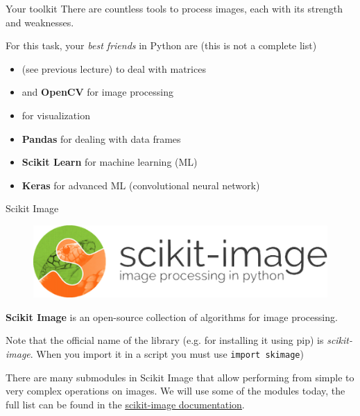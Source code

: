 \documentclass[9pt, aspectratio=169]{beamer}
\begin{document}
\begin{frame}
	{Your toolkit}
	There are countless tools to process images, each with its strength and weaknesses.

	For this task, your \textit{best friends} in Python are (this is not a complete list)

	\begin{itemize}
		\item \textbf{\color{orange}{Numpy}} (see previous lecture) to deal with matrices
		\item \textbf{\color{orange}{Scikit Image}} and \textbf{OpenCV} for image processing
		\item \textbf{\color{orange}{Matplotlib}} for visualization
		\item \textbf{Pandas} for dealing with data frames
		\item \textbf{Scikit Learn} for machine learning (ML)
		\item \textbf{Keras} for advanced ML (convolutional neural network)
	\end{itemize}
\end{frame}

\begin{frame}
	{Scikit Image}
	\begin{figure}
		\centering
		\includegraphics[width=.5\textwidth]{skimage.png}
	\end{figure}
	\textbf{Scikit Image} is an open-source collection of algorithms for image processing.

	Note that the official name of the library (e.g. for installing it using pip) is \textit{scikit-image}. When you import it in a script you must use \texttt{import skimage})

	\pause
	There are many submodules in Scikit Image that allow performing from simple to very complex operations on images. We will use some of the modules today, the full list can be found in the \href{https://scikit-image.org/docs/stable/api/api.html}{\underline{scikit-image documentation}}.

\end{frame}
\end{document}
